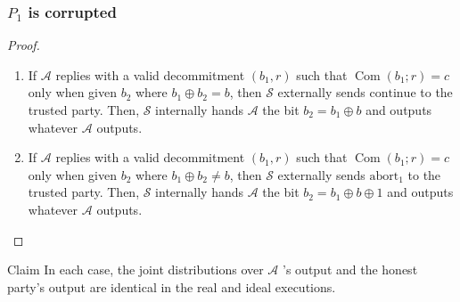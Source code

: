 \documentclass{beamer}
\begin{document}
    \begin{frame}
        \frametitle{$P_{1}$ is corrupted}
    
        \begin{proof}
            \begin{enumerate}[c]
                
                \item  If $\mathcal{A}$ replies with a valid decommitment $\left(b_{1}, r\right)$ such that $\operatorname{Com}\left(b_{1} ; r\right)=c$ only when given $b_{2}$ where $b_{1} \oplus b_{2}=b$, then $\mathcal{S}$ externally sends $\mathrm{continue}$ to the trusted party. Then, $\mathcal{S}$ internally hands $\mathcal{A}$ the bit $b_{2}=b_{1} \oplus b$ and outputs whatever $\mathcal{A}$ outputs.
                \item If $\mathcal{A}$ replies with a valid decommitment $\left(b_{1}, r\right)$ such that $\operatorname{Com}\left(b_{1} ; r\right)=c$ only when given $b_{2}$ where $b_{1} \oplus b_{2} \neq b$, then $\mathcal{S}$ externally sends $\mathrm{abort}_{1}$ to the trusted party. Then, $\mathcal{S}$ internally hands $\mathcal{A}$ the bit $b_{2}=b_{1} \oplus b \oplus 1$ and outputs whatever $\mathcal{A}$ outputs.
            \end{enumerate}
        \end{proof}

        \begin{block}{Claim}
            In each case,  the joint distributions over $\mathcal{A}$ 's output and the honest party's output are identical in the real and ideal executions.
            
        \end{block}
    
    \end{frame}
\end{document}
